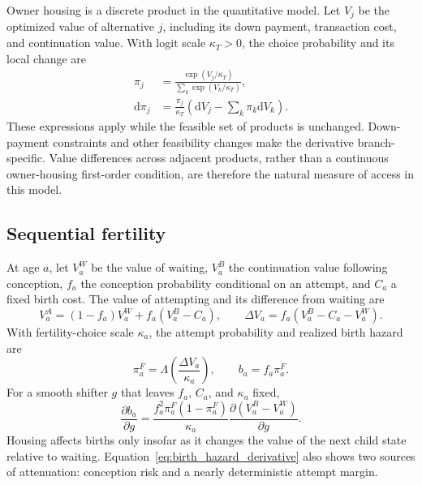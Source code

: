 \documentclass[11pt]{article}
\newcommand{\dd}{\mathrm{d}}
\begin{document}
Owner housing is a discrete product in the quantitative model.  Let $V_j$ be
the optimized value of alternative $j$, including its down payment,
transaction cost, and continuation value.  With logit scale $\kappa_T>0$, the
choice probability and its local change are
\begin{align}
 \pi_j&=\frac{\exp(V_j/\kappa_T)}{\sum_k\exp(V_k/\kappa_T)},
 \label{eq:tenure_logit}\\
 \dd\pi_j&=\frac{\pi_j}{\kappa_T}
 \left(\dd V_j-\sum_k\pi_k\dd V_k\right).
 \label{eq:tenure_logit_derivative}
\end{align}
These expressions apply while the feasible set of products is unchanged.
Down-payment constraints and other feasibility changes make the derivative
branch-specific.  Value differences across adjacent products, rather than a
continuous owner-housing first-order condition, are therefore the natural
measure of access in this model.

\subsection{Sequential fertility}

At age $a$, let $V_a^W$ be the value of waiting, $V_a^B$ the continuation
value following conception, $f_a$ the conception probability conditional on
an attempt, and $C_a$ a fixed birth cost.  The value of attempting and its
difference from waiting are
\begin{equation}
 V_a^A=(1-f_a)V_a^W+f_a(V_a^B-C_a),
 \qquad
 \Delta V_a=f_a(V_a^B-C_a-V_a^W).
 \label{eq:attempt_value}
\end{equation}
With fertility-choice scale $\kappa_a$, the attempt probability and realized
birth hazard are
\begin{equation}
 \pi_a^F=\Lambda\!\left(\frac{\Delta V_a}{\kappa_a}\right),
 \qquad
 b_a=f_a\pi_a^F.
 \label{eq:birth_hazard}
\end{equation}
For a smooth shifter $g$ that leaves $f_a$, $C_a$, and $\kappa_a$ fixed,
\begin{equation}
 \frac{\partial b_a}{\partial g}
 =\frac{f_a^2\pi_a^F(1-\pi_a^F)}{\kappa_a}
 \frac{\partial(V_a^B-V_a^W)}{\partial g}.
 \label{eq:birth_hazard_derivative}
\end{equation}
Housing affects births only insofar as it changes the value of the next child
state relative to waiting.  Equation~\eqref{eq:birth_hazard_derivative} also
shows two sources of attenuation: conception risk and a nearly deterministic
attempt margin.
\end{document}
